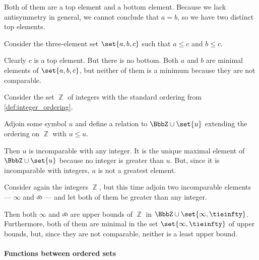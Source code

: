 \begin{example}
\begin{thmenum}
    Both of them are a top element and a bottom element. Because we lack antisymmetry in general, we cannot conclude that \( a = b \), so we have two distinct top elements.

     Consider the three-element set \( \set{ a, b, c } \) such that \( a \leq c \) and \( b \leq c \).

    Clearly \( c \) is a top element. But there is no bottom. Both \( a \) and \( b \) are minimal elements of \( \set{ a, b, c } \), but neither of them is a minimum because they are not comparable.

     Consider the set \( \BbbZ \) of integers with the standard ordering from \cref{def:integer_ordering}.

    Adjoin some symbol \( u \) and define a relation to \( \BbbZ \cup \set{ u } \) extending the ordering on \( \BbbZ \) with \( u \leq u \).

    Then \( u \) is incomparable with any integer. It is the unique maximal element of \( \BbbZ \cup \set{ u } \) because no integer is greater than \( u \). But, since it is incomparable with integers, \( u \) is not a greatest element.

     Consider again the integers \( \BbbZ \), but this time adjoin two incomparable elements --- \( \infty \) and \( \tieinfty \) --- and let both of them be greater than any integer.

    Then both \( \infty \) and \( \tieinfty \) are upper bounds of \( \BbbZ \) in \( \BbbZ \cup \set{ \infty, \tieinfty } \). Furthermore, both of them are minimal in the set \( \set{ \infty, \tieinfty } \) of upper bounds, but, since they are not comparable, neither is a least upper bound.
  \end{thmenum}
\end{example}

\paragraph{Functions between ordered sets}

